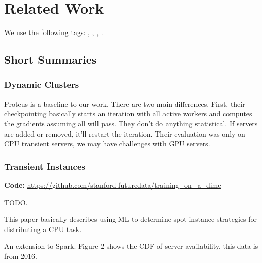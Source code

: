 \chapter{Related Work}
\label{ch:related work}

We use the following tags: \tagdynamic{}, \tagtransient{}, \tagmodelparallelism{}, \tagdataparallelism{}.

\section{Short Summaries}

\subsection{Dynamic Clusters}


\noindent \tagdynamic{} \tagdataparallelism{}

Proteus is a baseline to our work.
There are two main differences.
First, their checkpointing basically starts an iteration with all active workers
and computes the gradients assuming all will pass.
They don't do anything statistical.
If servers are added or removed, it'll restart the iteration.
Their evaluation was only on CPU transient servers, we may have challenges with
GPU servers.

\subsection{Transient Instances}

\tagdynamic{} \tagdataparallelism{}

\noindent \textbf{Code:} \url{https://github.com/stanford-futuredata/training_on_a_dime}

TODO.


\noindent \tagdynamic{} \tagdataparallelism{}


This paper basically describes using ML to determine spot instance strategies
for distributing a CPU task.


An extension to Spark.
Figure 2 shows the CDF of server availability, this data is from 2016.

